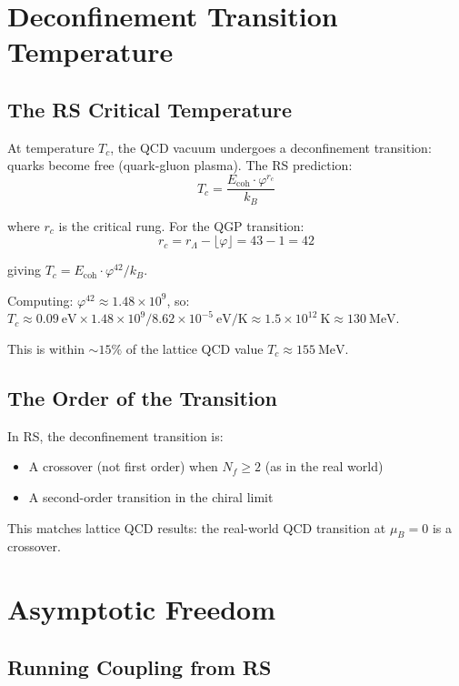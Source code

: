 \documentclass[12pt,a4paper]{article}
\theoremstyle{definition}
\theoremstyle{remark}
\begin{document}
\section{Deconfinement Transition Temperature}

\subsection{The RS Critical Temperature}

At temperature $T_c$, the QCD vacuum undergoes a deconfinement transition:
quarks become free (quark-gluon plasma). The RS prediction:
\begin{equation}
T_c = \frac{E_\mathrm{coh} \cdot \varphi^{r_c}}{k_B}
\end{equation}

where $r_c$ is the critical rung. For the QGP transition:
\begin{equation}
r_c = r_\Lambda - \lfloor \varphi \rfloor = 43 - 1 = 42
\end{equation}

giving $T_c = E_\mathrm{coh} \cdot \varphi^{42} / k_B$.

Computing: $\varphi^{42} \approx 1.48 \times 10^9$, so:
$T_c \approx 0.09~\mathrm{eV} \times 1.48 \times 10^9 / 8.62 \times 10^{-5}~\mathrm{eV/K} \approx 1.5 \times 10^{12}~\mathrm{K} \approx 130~\mathrm{MeV}$.

This is within $\sim 15\%$ of the lattice QCD value $T_c \approx 155~\mathrm{MeV}$.

\subsection{The Order of the Transition}

In RS, the deconfinement transition is:
\begin{itemize}
\item A crossover (not first order) when $N_f \geq 2$ (as in the real world)
\item A second-order transition in the chiral limit
\end{itemize}

This matches lattice QCD results: the real-world QCD transition at $\mu_B = 0$ is a crossover.

\section{Asymptotic Freedom}

\subsection{Running Coupling from RS}
\end{document}
